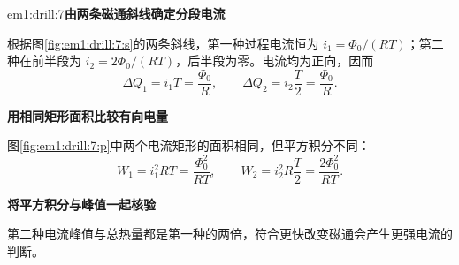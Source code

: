 \begin{drillsolution}{em1:drill:7}\textbf{由两条磁通斜线确定分段电流}\par\nobreak
根据图\ref{fig:em1:drill:7:s}的两条斜线，第一种过程电流恒为 $i_1=\Phi_0/(RT)$；第二种在前半段为 $i_2=2\Phi_0/(RT)$，后半段为零。电流均为正向，因而
\[\Delta Q_1=i_1T=\frac{\Phi_0}{R},\qquad
\Delta Q_2=i_2\frac T2=\frac{\Phi_0}{R}.\]



\par\medskip{}\noindent\textbf{用相同矩形面积比较有向电量}\par\nobreak
图\ref{fig:em1:drill:7:p}中两个电流矩形的面积相同，但平方积分不同：
\[W_1=i_1^2RT=\frac{\Phi_0^2}{RT},\qquad
W_2=i_2^2R\frac T2=\frac{2\Phi_0^2}{RT}.\]


\par\medskip{}\noindent\textbf{将平方积分与峰值一起核验}\par\nobreak
第二种电流峰值与总热量都是第一种的两倍，符合更快改变磁通会产生更强电流的判断。\end{drillsolution}
